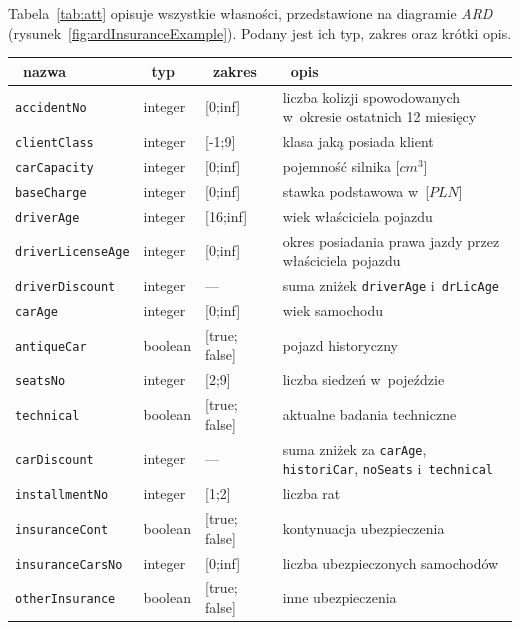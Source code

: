 Tabela~\ref{tab:att} opisuje wszystkie własności, przedstawione na diagramie \emph{ARD} (rysunek~\ref{fig:ardInsuranceExample}). Podany jest ich typ, zakres oraz krótki opis.
\begin{table}
    \begin{tabular}{|p{3.6cm}|p{1.4cm}|p{1.8cm}|p{7cm}|}
    \hline
    \textbf{~nazwa~} & \textbf{~typ~} & \textbf{~zakres~} & \textbf{~opis~}\\ \hline\hline
    \texttt{accidentNo} & integer & [0;inf] & liczba kolizji spowodowanych w~okresie ostatnich 12 miesięcy\\ \hline
    \texttt{clientClass} & integer & [-1;9] & klasa jaką posiada klient\\ \hline
    \texttt{carCapacity} & integer & [0;inf] & pojemność silnika [$cm^{3}$]\\ \hline
    \texttt{baseCharge} & integer & [0;inf] & stawka podstawowa w~[$PLN$]\\ \hline
    \texttt{driverAge} & integer & [16;inf] & wiek właściciela pojazdu\\ \hline
    \texttt{driverLicenseAge} & integer & [0;inf] & okres posiadania prawa jazdy przez właściciela pojazdu \\ \hline
    \texttt{driverDiscount} & integer & --- & suma zniżek \texttt{driverAge} i~\texttt{drLicAge} \\ \hline
    \texttt{carAge} & integer & [0;inf] & wiek samochodu\\ \hline
    \texttt{antiqueCar} & boolean & [true; false] & pojazd historyczny \\ \hline
    \texttt{seatsNo} & integer & [2;9] & liczba siedzeń w~pojeździe \\ \hline
    \texttt{technical} & boolean & [true; false] & aktualne badania techniczne\\ \hline
    \texttt{carDiscount} & integer & --- & suma zniżek za \texttt{carAge}, \texttt{historiCar}, \newline \texttt{noSeats} i~\texttt{technical}\\ \hline
    \texttt{installmentNo} & integer & [1;2] & liczba rat \\ \hline
    \texttt{insuranceCont} & boolean & [true; false] & kontynuacja ubezpieczenia \\ \hline
    \texttt{insuranceCarsNo} & integer & [0;inf] & liczba ubezpieczonych samochodów\\ \hline
    \texttt{otherInsurance} & boolean & [true; false] & inne ubezpieczenia\\ \hline

\end{tabular}
\end{table}
